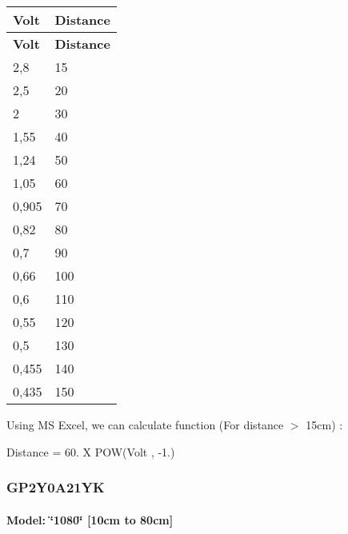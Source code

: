 \tabulinesep=1mm
\begin{longtabu} spread 0pt [c]{*{2}{|X[-1]}|}
\hline
\rowcolor{\tableheadbgcolor}\textbf{ Volt  }&\textbf{ Distance   }\\
\endfirsthead
\hline
\endfoot
\hline
\rowcolor{\tableheadbgcolor}\textbf{ Volt  }&\textbf{ Distance   }\\
,8  &15   \\
2,5  &20   \\
2  &30   \\
1,55  &40   \\
1,24  &50   \\
1,05  &60   \\
0,905  &70   \\
0,82  &80   \\
0,7  &90   \\
0,66  &100   \\
0,6  &110   \\
0,55  &120   \\
0,5  &130   \\
0,455  &140   \\
0,435  &150   \\
\end{longtabu}


Using MS Excel, we can calculate function (For distance $>$ 15cm) \+:

Distance = 60. X P\+OW(Volt , -\/1.)

\subsubsection*{G\+P2\+Y0\+A21\+YK}

\paragraph*{Model\+: \char`\"{}1080\char`\"{} \mbox{[}10cm to 80cm\mbox{]}}

